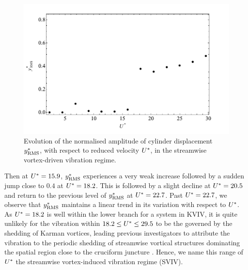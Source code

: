 \documentclass[oneside]{utmthesis}
\begin{document}
\begin{figure}
  \centering
  \includegraphics[width=1\textwidth]{figs/yStrRMS1}
  \caption{Evolution of the normalised \rms{} amplitude of cylinder displacement $y^{*}_{\text{RMS}}$, with respect to reduced velocity $U^{*}$, in the streamwise vortex-driven vibration regime.} \label{fig:yStrRMS1}
\end{figure}

Then at $U^{*} = 15.9$, $y^{*}_{\text{RMS}}$ experiences a very weak increase followed by a sudden jump close to $0.4$ at $U^{*} = 18.2$. This is followed by a slight decline at $U^{*} = 20.5$ and return to the previous level of $y^{*}_{\text{RMS}}$ at $U^{*} = 22.7$. Past $U^{*} = 22.7$, we observe that $y^{*}_{\text{RMS}}$ maintains a linear trend in its variation with respect to $U^{*}$. As $U^{*} = 18.2$ is well within the lower branch for a system in KVIV, it is quite unlikely for the vibration within $18.2 \leq U^{*} \leq 29.5$ to be the governed by the shedding of Karman vortices, leading previous investigators to attribute the vibration to the periodic shedding of streamwise vortical structures dominating the spatial region close to the cruciform juncture \citep{Shirakashi1989,Hemsuwan2018b,Hemsuwan2018d}. Hence, we name this range of $U^{*}$ the streamwise vortex-induced vibration regime (SVIV).
\end{document}
